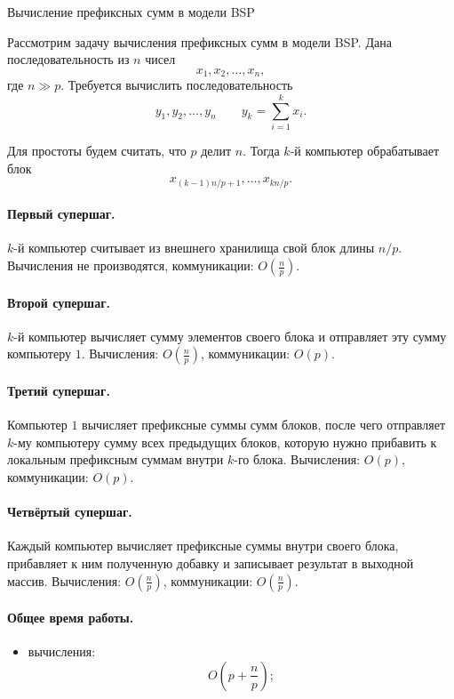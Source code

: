 \begin{Example}{Вычисление префиксных сумм в модели BSP}{}
	
	Рассмотрим задачу вычисления префиксных сумм в модели BSP. Дана последовательность из \(n\) чисел
	\[
	x_1, x_2, \dots, x_n,
	\]
	где \(n \gg p\). Требуется вычислить последовательность
	\[
	y_1, y_2, \dots, y_n \qquad y_k = \sum_{i=1}^k x_i.
	\]
	
	Для простоты будем считать, что \(p\) делит \(n\). Тогда \(k\)-й компьютер обрабатывает блок
	\[
	x_{(k-1)n/p+1}, \dots, x_{kn/p}.
	\]
	
	\paragraph{Первый супершаг.}
	\(k\)-й компьютер считывает из внешнего хранилища свой блок длины \(n/p\).
	Вычисления не производятся, коммуникации: \(O\!\left(\frac{n}{p}\right)\).
	
	\paragraph{Второй супершаг.}
	\(k\)-й компьютер вычисляет сумму элементов своего блока и отправляет эту сумму компьютеру \(1\).
	Вычисления: \(O\!\left(\frac{n}{p}\right)\), коммуникации: \(O(p)\).
	
	\paragraph{Третий супершаг.}
	Компьютер \(1\) вычисляет префиксные суммы сумм блоков, после чего отправляет \(k\)-му компьютеру сумму всех предыдущих блоков, которую нужно прибавить к локальным префиксным суммам внутри \(k\)-го блока.
	Вычисления: \(O(p)\), коммуникации: \(O(p)\).
	
	\paragraph{Четвёртый супершаг.}
	Каждый компьютер вычисляет префиксные суммы внутри своего блока, прибавляет к ним полученную добавку и записывает результат в выходной массив.
	Вычисления: \(O\!\left(\frac{n}{p}\right)\), коммуникации: \(O\!\left(\frac{n}{p}\right)\).
	
	\paragraph{Общее время работы.}
	\begin{itemize}
		\item вычисления:
		\[
		O\!\left(p+\frac{n}{p}\right);
		\]
		

\end{itemize}
\end{Example}
